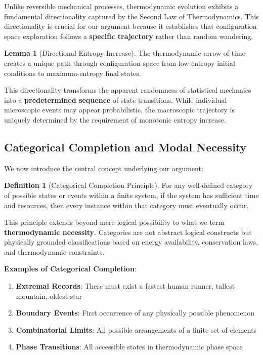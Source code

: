 \documentclass[12pt,a4paper]{article}
\theoremstyle{definition}
\newtheorem{definition}{Definition}[section]
\newtheorem{lemma}{Lemma}[section]
\begin{document}
{Unlike reversible mechanical processes, thermodynamic evolution exhibits a fundamental directionality captured by the Second Law of Thermodynamics. This directionality is crucial for our argument because it establishes that configuration space exploration follows a \textbf{specific trajectory} rather than random wandering.

\begin{lemma}[Directional Entropy Increase]
The thermodynamic arrow of time creates a unique path through configuration space from low-entropy initial conditions to maximum-entropy final states.
\end{lemma}

This directionality transforms the apparent randomness of statistical mechanics into a \textbf{predetermined sequence} of state transitions. While individual microscopic events may appear probabilistic, the macroscopic trajectory is uniquely determined by the requirement of monotonic entropy increase.

\subsection{Categorical Completion and Modal Necessity}

We now introduce the central concept underlying our argument:

\begin{definition}[Categorical Completion Principle]
For any well-defined category of possible states or events within a finite system, if the system has sufficient time and resources, then every instance within that category must eventually occur.
\end{definition}

This principle extends beyond mere logical possibility to what we term \textbf{thermodynamic necessity}. Categories are not abstract logical constructs but physically grounded classifications based on energy availability, conservation laws, and thermodynamic constraints.

\textbf{Examples of Categorical Completion}:
\begin{enumerate}
\item \textbf{Extremal Records}: There must exist a fastest human runner, tallest mountain, oldest star
\item \textbf{Boundary Events}: First occurrence of any physically possible phenomenon
\item \textbf{Combinatorial Limits}: All possible arrangements of a finite set of elements
\item \textbf{Phase Transitions}: All accessible states in thermodynamic phase space
\end{enumerate}

}
\end{document}
